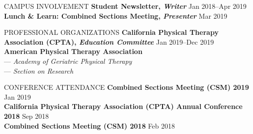 \documentclass{resume} %
\begin{document}
\begin{rSection}{CAMPUS INVOLVEMENT}
{\textbf{Student Newsletter, \textit{Writer}} \hfill{Jan 2018--Apr 2019}}
\\
{\textbf{Lunch \& Learn: Combined Sections Meeting, \textit{Presenter}} \hfill{Mar 2019}}
\end{rSection} 
\begin{rSection}{PROFESSIONAL ORGANIZATIONS}
{\textbf{California Physical Therapy Association (CPTA), \textit{Education Committee}} \hfill{Jan 2019--Dec 2019}}
\\
{\textbf{American Physical Therapy Association}\\
\-\hspace{5mm} --- \textit{Academy of Geriatric Physical Therapy}\\
\-\hspace{5mm} --- \textit{Section on Research}}
\end{rSection} 
\begin{rSection}{CONFERENCE ATTENDANCE}
{\textbf{Combined Sections Meeting (CSM) 2019} \hfill{Jan 2019}}
\\
{\textbf{California Physical Therapy Association (CPTA) Annual Conference 2018} \hfill{Sep 2018}}\\
{\textbf{Combined Sections Meeting (CSM) 2018} \hfill{Feb 2018}}
\end{rSection}
\end{document}
